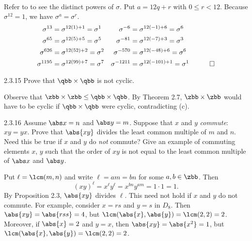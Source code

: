 \begin{sol}
    Refer to  to see the distinct powers of $\sigma$.
	Put $a = 12q + r$ with $0 \leq r < 12$.
    Because $\sigma^{12} = 1$, we have $\sigma^a = \sigma^r$.
    \begin{align*}
        && \sigma^{13} &= \sigma^{12(1) + 1} = \sigma^1 & 
        \sigma^{-6} &= \sigma^{12(-1) + 6} = \sigma^6 \\
        && \sigma^{65} &= \sigma^{12(5) + 5} = \sigma^5 & 
        \sigma^{-81} &= \sigma^{12(-7) + 3} = \sigma^3 \\
        && \sigma^{626} &= \sigma^{12(52) + 2} = \sigma^2 & 
        \sigma^{-570} &= \sigma^{12(-48) + 6} = \sigma^6 \\
        && \sigma^{1195} &= \sigma^{12(99) + 7} = \sigma^7 & 
        \sigma^{-1211} &= \sigma^{12(-101) + 1} = \sigma^1 && \qedhere
    \end{align*}
\end{sol}

\begin{exercise}{2.3.15}
    Prove that $\qbb \times \qbb$ is not cyclic.
\end{exercise}

\begin{sol}
    Observe that $\zbb \times \zbb \leq \qbb \times \qbb$.
    By Theorem 2.7, $\zbb \times \zbb$ would have to be cyclic if $\qbb \times \qbb$ were cyclic, contradicting (c).
\end{sol}

\begin{exercise}{2.3.16}
    Assume $\abs x = n$ and $\abs y = m$.
	Suppose that $x$ and $y$ \emph{commute}: $xy = yx$.
	Prove that $\abs{xy}$ divides the least common multiple of $m$ and $n$.
	Need this be true if $x$ and $y$ do \emph{not} commute?
	Give an example of commuting elements $x$, $y$ such that the order of $xy$ is not equal to the least common multiple of $\abs x$ and $\abs y$.
\end{exercise}

\begin{sol}
    Put $\ell = \lcm(m, n)$ and write $\ell = am = bn$ for some $a, b \in \zbb$.
    Then
    \[
    	(xy)^\ell = x^\ell y^\ell = x^{bn}y^{am} = 1 \cdot 1 = 1.
    \]
    By Proposition 2.3, $\abs{xy}$ divides $\ell$.
	This need not hold if $x$ and $y$ do not commute.
    For example, consider $x = rs$ and $y = s$ in $D_8$. Then $\abs{xy} = \abs{rss} = 4$, but $\lcm(\abs{x}, \abs{y}) = \lcm(2, 2) = 2$.
    Moreover, if $\abs{x} = 2$ and $y = x$, then $\abs{xy} = \abs{x^2} = 1$, but $\lcm(\abs{x}, \abs{y}) = \lcm(2, 2) = 2$.
\end{sol}


